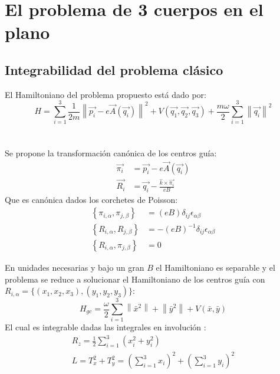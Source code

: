 \documentclass[xcolor=dvipsnames]{beamer}
\newcommand{\norm}[1]{\left\lVert #1 \right\rVert}
\newcommand{\roundP}[1]{\left( #1 \right)}
\newcommand{\poisson}[2]{\left\lbrace #1, #2 \right\rbrace}
\begin{document}
\section{El problema de 3 cuerpos en el plano}
\subsection{Integrabilidad del problema clásico}
\begin{frame}
El Hamiltoniano del problema propuesto está dado por:
\begin{equation*}
H = \sum_{i=1}^{3} \frac{1}{2m} \norm{ \vec{p_i} - 
e\vec{ A } \left( \vec{q_i} \right)}^2
+ V \roundP{ \vec{q_1},\vec{q_2},\vec{q_3} }
+\frac{m\omega}{2}\sum_{i=1}^{3} \norm{\vec{q_i}}^2
\end{equation*}
\\~\\
Se propone la transformación canónica de los centros guía:
\begin{align*}
\vec{\pi_i} &= \vec{p_i} - e\vec{A}\roundP{\vec{q_i}}\\
\vec{R_i} &= \vec{q_i} - \frac{\hat{k}\times\vec{\pi_i}}{eB}
\end{align*}
Que es canónica dados los corchetes de Poisson:
\begin{align*}
\poisson{\pi_{i,\alpha}}{\pi_{j,\beta}}&=\roundP{eB}\delta_{ij}\epsilon_{\alpha \beta}\\  
\poisson{R_{i,\alpha}}{R_{j,\beta}}&= -\roundP{eB}^{-1} \delta_{ij}\epsilon_{\alpha \beta}\\  
\poisson{R_{i,\alpha}}{\pi_{j,\beta}}&=0
\end{align*}
\end{frame}
\begin{frame}
En unidades necesarias y bajo un gran $B$ el Hamiltoniano es separable y el problema se reduce a solucionar el Hamiltoniano de los centros guía con $R_{i,\alpha} = \{(x_1,x_2,x_3),(y_1,y_2,y_3)\}$:
\begin{equation*}
H_{gc} = \frac{{\omega}}{2} \sum_{i=1}^{3} \norm{\bar{x}^2} + \norm{\bar{y}^2}
+ V\roundP{\bar{x},\bar{y}}
\end{equation*}
El cual es integrable dadas las integrales en involución \cite{scheck}:
\begin{align*}
R_z = \frac{1}{2} \sum_{i=1}^{3} \roundP{x_i^2 + y_i^2}\\
L = T_x^2 + T_y^2 = \roundP{\sum_{i=1}^{3} x_i}^2 + \roundP{\sum_{i=1}^{3} y_i}^2\\
\end{align*}
\end{frame}
\end{document}
